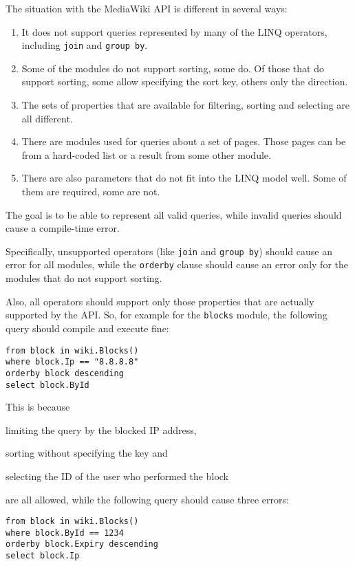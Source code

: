 The situation with the MediaWiki \ac{API} is different in several ways:

\begin{enumerate}
\item It does not support queries represented by many of the LINQ operators, including \lstinline{join} and \lstinline{group by}.
\item Some of the modules do not support sorting, some do. Of those that do support sorting, some allow specifying the sort key, others only the direction.
\item The sets of properties that are available for filtering, sorting and selecting are all different.
\item There are modules used for queries about a set of pages. Those pages can be from a hard-coded list or a result from some other module.
\item There are also parameters that do not fit into the LINQ model well. Some of them are required, some are not.
\end{enumerate}

The goal is to be able to represent all valid queries, while invalid queries should cause a compile-time error.

Specifically, unsupported operators (like \lstinline{join} and \lstinline{group by}) should cause an error for all modules,
while the \lstinline{orderby} clause should cause an error only for the modules that do not support sorting.

Also, all operators should support only those properties that are actually supported by the \ac{API}.
So, for example for the \texttt{blocks} module, the following query should compile and execute fine:

\begin{lstlisting}
from block in wiki.Blocks()
where block.Ip == "8.8.8.8"
orderby block descending
select block.ById
\end{lstlisting}

This is because
\begin{compactitem}
\item limiting the query by the blocked \ac{IP} address,
\item sorting without specifying the key and
\item selecting the ID of the user who performed the block
\end{compactitem}
are all allowed, while the following query should cause three errors:

\begin{lstlisting}
from block in wiki.Blocks()
where block.ById == 1234
orderby block.Expiry descending
select block.Ip
\end{lstlisting}

